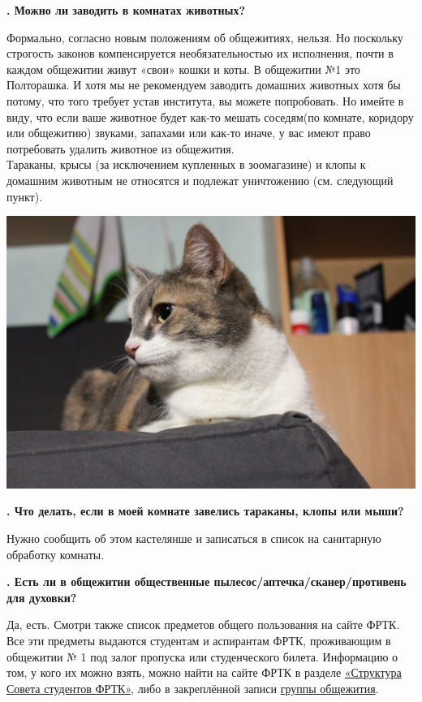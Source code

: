 \documentclass[14pt]{extarticle}
\newcounter{question}
\newcommand\Que[1]{%
    \begin{minipage}{\textwidth}
    \leavevmode\par
    \stepcounter{question}
    \noindent
    {\large\textbf{\thequestion. #1}}\par}
\newcommand\Ans[2][]{%
    \leavevmode\par\noindent
    {\leftskip37pt
    \textbf{#1}#2\par}
    \end{minipage}}
\newcommand\Partans[2][]{%
    \leavevmode\par\noindent
    {\leftskip37pt
    \textbf{#1}#2\par}}
\begin{document}
\Que{Можно ли заводить в комнатах животных?}
\Partans{Формально, согласно новым положениям об общежитиях, нельзя. Но поскольку строгость законов компенсируется необязательностью их исполнения, почти в каждом общежитии живут «свои» кошки и коты. В общежитии №1 это Полторашка. И хотя мы не рекомендуем заводить домашних животных хотя бы потому, что того требует устав института, вы можете попробовать. Но имейте в виду, что если ваше животное будет как-то мешать соседям(по комнате, коридору или общежитию) звуками, запахами или как-то иначе, у вас имеют право потребовать удалить животное из общежития. \\ Тараканы, крысы (за исключением купленных в зоомагазине) и клопы к домашним животным не относятся и подлежат уничтожению (см. следующий пункт). \\ }
\begin{minipage}{\linewidth}
	\includegraphics[width = \linewidth]{resources/poltorashechka.jpg}
	\captionsetup{textfont=Large, labelfont=bf}
	\begin{center}
	\end{center}
\end{minipage}
\end{minipage}

\Que{Что делать, если в моей комнате завелись тараканы, клопы или мыши?}
\Ans{Нужно сообщить об этом кастелянше и записаться в список на санитарную обработку комнаты.}

\Que{Есть ли в общежитии общественные пылесос/аптечка/сканер/противень для духовки?}
\Ans{Да, есть. Смотри также список предметов общего пользования на сайте ФРТК. Все эти предметы выдаются студентам и аспирантам ФРТК, проживающим в общежитии № 1 под залог пропуска или студенческого билета. Информацию о том, у кого их можно взять, можно найти на сайте ФРТК в разделе \href{https://mipt.ru/drec/forstudents/studsovet/structure.php}{«Структура Совета студентов ФРТК»}, либо в закреплённой записи \href{https://vk.com/frtk_dorm}{группы общежития}.}
\end{document}
